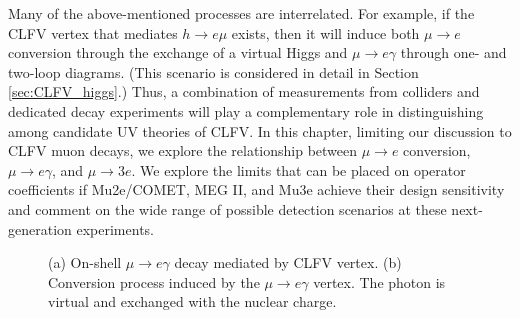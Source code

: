 \documentclass{book}[letterpaper,12pt]
\begin{document}
Many of the above-mentioned processes are interrelated. For example, if the CLFV vertex that mediates $h\rightarrow e\mu$ exists, then it will induce both $\mu\rightarrow e$ conversion through the exchange of a virtual Higgs and $\mu\rightarrow e\gamma$ through one- and two-loop diagrams. (This scenario is considered in detail in Section \ref{sec:CLFV_higgs}.) Thus, a combination of measurements from colliders and dedicated decay experiments will play a complementary role in distinguishing among candidate UV theories of CLFV. In this chapter, limiting our discussion to CLFV muon decays, we explore the relationship between $\mu\rightarrow e$ conversion, $\mu\rightarrow e\gamma$, and $\mu\rightarrow 3e$. We explore the limits that can be placed on operator coefficients if Mu2e/COMET, MEG II, and Mu3e achieve their design sensitivity and comment on the wide range of possible detection scenarios at these next-generation experiments.

\begin{figure}
\centering
{}
\hspace{4cm}
\caption{(a) On-shell $\mu\rightarrow e\gamma$ decay mediated by CLFV vertex. (b) Conversion process induced by the $\mu\rightarrow e\gamma$ vertex. The photon is virtual and exchanged with the nuclear charge.}
\label{fig:mu_e_gamma_diagrams}
\end{figure}
\end{document}

